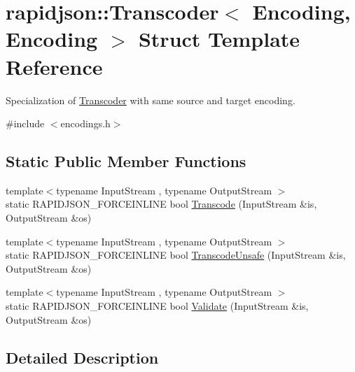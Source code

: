 \hypertarget{structrapidjson_1_1_transcoder_3_01_encoding_00_01_encoding_01_4}{}\section{rapidjson\+::Transcoder$<$ Encoding, Encoding $>$ Struct Template Reference}
\label{structrapidjson_1_1_transcoder_3_01_encoding_00_01_encoding_01_4}


Specialization of \mbox{\hyperlink{structrapidjson_1_1_transcoder}{Transcoder}} with same source and target encoding.  




{\ttfamily \#include $<$encodings.\+h$>$}

\subsection*{Static Public Member Functions}
\begin{DoxyCompactItemize}
\item 
{\footnotesize template$<$typename Input\+Stream , typename Output\+Stream $>$ }\\static R\+A\+P\+I\+D\+J\+S\+O\+N\+\_\+\+F\+O\+R\+C\+E\+I\+N\+L\+I\+NE bool \mbox{\hyperlink{structrapidjson_1_1_transcoder_3_01_encoding_00_01_encoding_01_4_a4c5e8e01daad553a941f5ea79c4a7339}{Transcode}} (Input\+Stream \&is, Output\+Stream \&os)
\item 
{\footnotesize template$<$typename Input\+Stream , typename Output\+Stream $>$ }\\static R\+A\+P\+I\+D\+J\+S\+O\+N\+\_\+\+F\+O\+R\+C\+E\+I\+N\+L\+I\+NE bool \mbox{\hyperlink{structrapidjson_1_1_transcoder_3_01_encoding_00_01_encoding_01_4_a9c948b02461065bf29e804f3450d693c}{Transcode\+Unsafe}} (Input\+Stream \&is, Output\+Stream \&os)
\item 
{\footnotesize template$<$typename Input\+Stream , typename Output\+Stream $>$ }\\static R\+A\+P\+I\+D\+J\+S\+O\+N\+\_\+\+F\+O\+R\+C\+E\+I\+N\+L\+I\+NE bool \mbox{\hyperlink{structrapidjson_1_1_transcoder_3_01_encoding_00_01_encoding_01_4_ab95578d89524b757c72c246e7e663417}{Validate}} (Input\+Stream \&is, Output\+Stream \&os)
\end{DoxyCompactItemize}


\subsection{Detailed Description}
